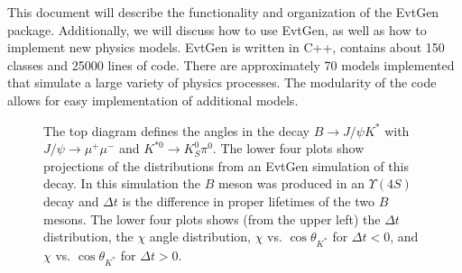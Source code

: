 This document will describe the functionality and 
organization of the EvtGen package.  Additionally, 
we will discuss how to use EvtGen, as well as how to
implement new physics models. 
EvtGen is written in C++, contains about 150 classes and
25000 lines of code. There are approximately 70 models implemented 
that simulate a large variety of physics processes.  The modularity
of the code allows for easy implementation of additional
models.  


\begin{figure}[b]
\begin{center}
\end{center}
\caption{
The top diagram defines the angles in the decay $B \rightarrow J/\psi K^*$
with $J/\psi\rightarrow \mu^+\mu^-$ and $K^{*0}\rightarrow K^0_S\pi^0$. 
The lower four plots show projections of the distributions from an EvtGen
simulation of this decay. In this simulation the $B$ meson was produced
in an $\Upsilon(4S)$ decay and $\Delta t$ is the difference in proper
lifetimes of the two $B$ mesons.
The lower four plots shows (from the upper left) the $\Delta t$ distribution,
the $\chi$ angle distribution, $\chi$ vs. $\cos \theta_{K^*}$ for
$\Delta t < 0$, and $\chi$ vs. $\cos \theta_{K^*}$ for
$\Delta t > 0$.
\label{fig:cpvio}
}

\end{figure}



%






